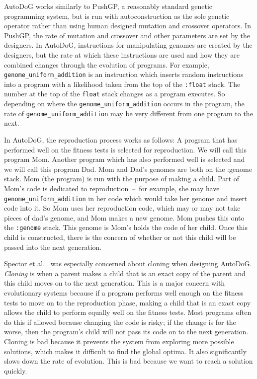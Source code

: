 \documentclass{sig-alternate}
\begin{document}
AutoDoG works similarly to PushGP, a reasonably standard genetic programming system, but is run with autoconstruction as the sole genetic operator rather than using human designed mutation and crossover operators. In PushGP, the rate of mutation and crossover and other parameters are set by the designers. In AutoDoG, instructions for manipulating genomes are created by the designers, but the rate at which these instructions are used and how they are combined changes through the evolution of programs. For example, \texttt{genome\_uniform\_addition} is an instruction which inserts random instructions into a program with a likelihood taken from the top of the \texttt{:float} stack. The number at the top of the \texttt{float} stack changes as a program executes. So depending on where the \texttt{genome\_uniform\_addition} occurs in the program, the rate of \texttt{genome\_uniform\_addition} may be very different from one program to the next.

In AutoDoG, the reproduction process works as follows:
A program that has performed well on the fitness tests is selected for reproduction. We will call this program Mom. Another program which has also performed well is selected and we will call this program Dad. Mom and Dad's genomes are both on the :genome stack. Mom (the program) is run with the purpose of making a child. Part of Mom's code is dedicated to reproduction~--~for example, she may have \texttt{genome\_uniform\_addition} in her code which would take her genome and insert code into it. So Mom uses her reproduction code, which may or may not take pieces of dad's genome, and Mom makes a new genome. Mom pushes this onto the \texttt{:genome} stack. This genome is Mom's holds the code of her child. Once this child is constructed, there is the concern of whether or not this child will be passed into the next generation.

Spector et al.~\cite{spector:2016} was especially concerned about cloning when designing AutoDoG. \textit{Cloning} is when a parent makes a child that is an exact copy of the parent and this child moves on to the next generation. This is a major concern with evolutionary systems because if a program performs well enough on the fitness tests to move on to the reproduction phase, making a child that is an exact copy allows the child to perform equally well on the fitness tests. Most programs often do this if allowed because changing the code is risky; if the change is for the worse, then the program's child will not pass its code on to the next generation. Cloning is bad because it prevents the system from exploring more possible solutions, which makes it difficult to find the global optima. It also significantly slows down the rate of evolution. This is bad because we want to reach a solution quickly.
\end{document}
